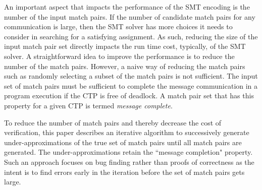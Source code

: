 An important aspect that impacts the performance of the SMT encoding is the number of the input match pairs. 
If the number of candidate match pairs for any communication is large, then the SMT solver has more choices it needs to consider in searching for a satisfying assignment. As such, reducing the size of the input match pair set directly impacts the run time cost, typically, of the SMT solver. 
A straightforward idea to improve the performance is to reduce the number of the match pairs. However, a naive way of reducing the match pairs such as randomly selecting a subset of the match pairs is not sufficient. The input set of match pairs must be sufficient to complete the message communication in a program execution if the CTP is free of deadlock. A match pair set that has this property for a given CTP is termed \emph{message complete}.

To reduce the number of match pairs and thereby decrease the cost of verification, this paper describes an iterative algorithm to successively generate under-approximations of the true set of match pairs until all match pairs are generated. The under-approximations retain the ``message completion" property. 
Such an approach focuses on bug finding rather than proofs of correctness as the intent is to find errors early in the iteration before the set of match pairs gets large.


